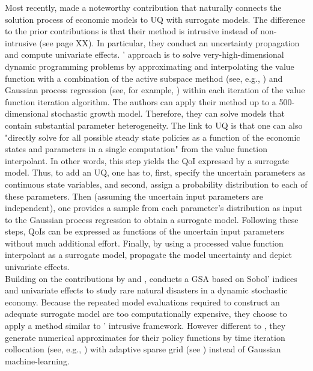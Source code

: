 \newline
Most recently, \cite{Scheidegger.2019} made a noteworthy contribution that naturally connects the solution process of economic models to UQ with surrogate models. The difference to the prior contributions is that their method is intrusive instead of non-intrusive (see page XX). In particular, they conduct an uncertainty propagation and compute univariate effects. \citeauthor{Scheidegger.2019}' approach is to solve very-high-dimensional dynamic programming problems by approximating and interpolating the value function with a combination of the active subspace method (see, e.g., \cite{Constantine.2015}) and Gaussian process regression (see, for example, \cite{Rasmussen.2005}) within each iteration of the value function iteration algorithm. The authors can apply their method up to a 500-dimensional stochastic growth model. Therefore, they can solve models that contain substantial parameter heterogeneity.
The link to UQ is that one can also "directly solve for all possible steady state policies as a function of the economic states and parameters in a single computation" \cite[p.~4]{Scheidegger.2019} from the value function interpolant. In other words, this step yields the QoI expressed by a surrogate model. Thus, to add an UQ, one has to, first, specify the uncertain parameters as continuous state variables, and second, assign a probability distribution to each of these parameters. Then (assuming the uncertain input parameters are independent), one provides a sample from each parameter's distribution as input to the Gaussian process regression to obtain a surrogate model. Following these steps, QoIs can be expressed as functions of the uncertain input parameters without much additional effort. Finally, by using a processed value function interpolant as a surrogate model, \citeauthor{Scheidegger.2019} propagate the model uncertainty and depict univariate effects.\\
\newline
Building on the contributions by \cite{Harenberg.2019} and \cite{Scheidegger.2019}, \cite{Usui.2019} conducts a GSA based on Sobol' indices and univariate effects to study rare natural disasters in a dynamic stochastic economy. Because the repeated model evaluations required to construct an adequate surrogate model are too computationally expensive, they choose to apply a  method similar to \citeauthor{Scheidegger.2019}' intrusive framework. However different to \cite{Scheidegger.2019}, they generate numerical approximates for their policy functions by time iteration collocation (see, e.g., \cite{Judd.1998}) with adaptive sparse grid (see  \cite{Scheidegger.2018}) instead of Gaussian machine-learning.

